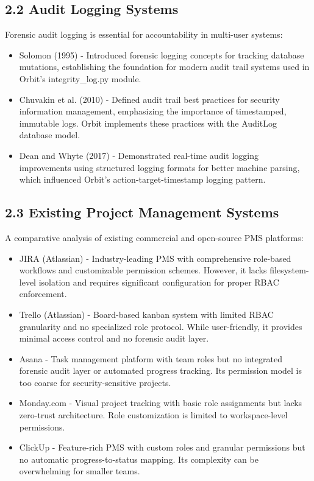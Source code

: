 ﻿\documentclass[12pt]{article}
\begin{document}
\subsection*{2.2 Audit Logging Systems}
Forensic audit logging is essential for accountability in multi-user systems:
\begin{itemize}
\item {\color{secondary}Solomon (1995)} - Introduced forensic logging concepts for tracking database mutations, establishing the foundation for modern audit trail systems used in Orbit's integrity\_log.py module.
\item {\color{secondary}Chuvakin et al. (2010)} - Defined audit trail best practices for security information management, emphasizing the importance of timestamped, immutable logs. Orbit implements these practices with the AuditLog database model.
\item {\color{secondary}Dean and Whyte (2017)} - Demonstrated real-time audit logging improvements using structured logging formats for better machine parsing, which influenced Orbit's action-target-timestamp logging pattern.
\end{itemize}

\subsection*{2.3 Existing Project Management Systems}
A comparative analysis of existing commercial and open-source PMS platforms:
\begin{itemize}
\item {\color{secondary}JIRA (Atlassian)} - Industry-leading PMS with comprehensive role-based workflows and customizable permission schemes. However, it lacks filesystem-level isolation and requires significant configuration for proper RBAC enforcement.
\item {\color{secondary}Trello (Atlassian)} - Board-based kanban system with limited RBAC granularity and no specialized role protocol. While user-friendly, it provides minimal access control and no forensic audit layer.
\item {\color{secondary}Asana} - Task management platform with team roles but no integrated forensic audit layer or automated progress tracking. Its permission model is too coarse for security-sensitive projects.
\item {\color{secondary}Monday.com} - Visual project tracking with basic role assignments but lacks zero-trust architecture. Role customization is limited to workspace-level permissions.
\item {\color{secondary}ClickUp} - Feature-rich PMS with custom roles and granular permissions but no automatic progress-to-status mapping. Its complexity can be overwhelming for smaller teams.
\end{itemize}
\end{document}
